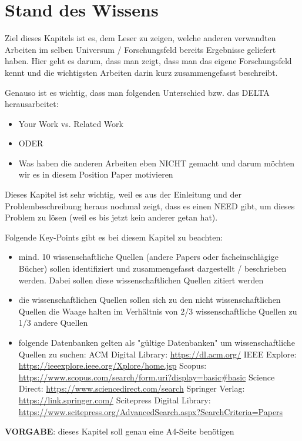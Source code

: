 
\section{Stand des Wissens}


Ziel dieses Kapitels ist es, dem Leser zu zeigen, welche anderen verwandten Arbeiten im selben Universum / Forschungsfeld bereits Ergebnisse geliefert haben. Hier geht es darum, dass man zeigt, dass man das eigene Forschungsfeld kennt und die wichtigsten Arbeiten darin kurz zusammengefasst beschreibt. 

Genauso ist es wichtig, dass man folgenden Unterschied bzw. das DELTA herausarbeitet:
\begin{itemize}
	\item[] Your Work vs. Related Work
	\item[] ODER
	\item[] Was haben die anderen Arbeiten eben NICHT gemacht und darum möchten wir es in diesem Position Paper motivieren
\end{itemize}

Dieses Kapitel ist sehr wichtig, weil es aus der Einleitung und der Problembeschreibung heraus nochmal zeigt, dass es einen NEED gibt, um dieses Problem zu lösen (weil es bis jetzt kein anderer getan hat).

Folgende Key-Points gibt es bei diesem Kapitel zu beachten:
\begin{itemize}
	\item mind. 10 wissenschaftliche Quellen (andere Papers oder facheinschlägige Bücher) sollen identifiziert und zusammengefasst dargestellt / beschrieben werden. Dabei sollen diese wissenschaftlichen Quellen zitiert werden
	\item die wissenschaftlichen Quellen sollen sich zu den nicht wissenschaftlichen Quellen die Waage halten im Verhältnis von 2/3 wissenschaftliche Quellen zu 1/3 andere Quellen 
	\item folgende Datenbanken gelten als "gültige Datenbanken" um wissenschaftliche Quellen zu suchen:
	\subitem ACM Digital Library: \href{https://dl.acm.org/}{https://dl.acm.org/}	
	\subitem IEEE Explore: \href{https://ieeexplore.ieee.org/Xplore/home.jsp}{https://ieeexplore.ieee.org/Xplore/home.jsp} 
	\subitem Scopus: \href{https://www.scopus.com/search/form.uri?display=basic\#basic}{https://www.scopus.com/search/form.uri?display=basic\#basic}
	\subitem Science Direct: \href{https://www.sciencedirect.com/search}{https://www.sciencedirect.com/search} 
	\subitem Springer Verlag: \href{https://link.springer.com/}{https://link.springer.com/}
	\subitem Scitepress Digital Library: \href{https://www.scitepress.org/AdvancedSearch.aspx?SearchCriteria=Papers}{https://www.scitepress.org/AdvancedSearch.aspx?SearchCriteria=Papers} 
\end{itemize}

\textbf{VORGABE}: dieses Kapitel soll genau eine A4-Seite benötigen